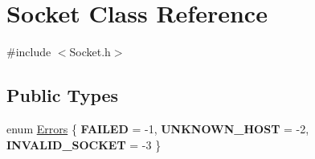 \hypertarget{classSocket}{\section{Socket Class Reference}
\label{classSocket}
}


{\ttfamily \#include $<$Socket.\-h$>$}

\subsection*{Public Types}
\begin{DoxyCompactItemize}
\item 
enum \hyperlink{classSocket_a9f68308228badcdd299cd83e62e36976}{Errors} \{ {\bfseries F\-A\-I\-L\-E\-D} = -\/1, 
{\bfseries U\-N\-K\-N\-O\-W\-N\-\_\-\-H\-O\-S\-T} = -\/2, 
{\bfseries I\-N\-V\-A\-L\-I\-D\-\_\-\-S\-O\-C\-K\-E\-T} = -\/3
 \}
\end{DoxyCompactItemize}
